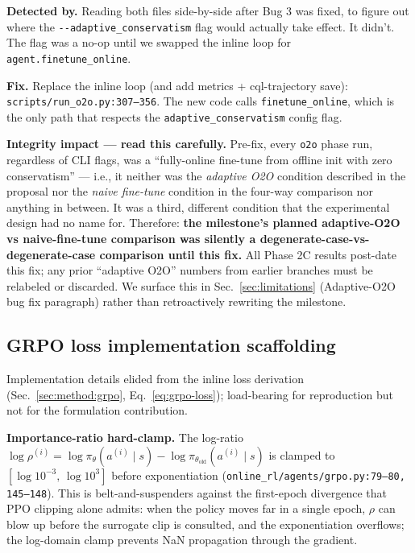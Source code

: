 \textbf{Detected by.} Reading both files side-by-side after Bug 3 was
fixed, to figure out where the \texttt{-{}-adaptive\_conservatism} flag
would actually take effect. It didn't. The flag was a no-op until we
swapped the inline loop for \texttt{agent.finetune\_online}.

\textbf{Fix.} Replace the inline loop (and add metrics + cql-trajectory
save): \texttt{scripts/run\_o2o.py:307--356}. The new code calls
\texttt{finetune\_online}, which is the only path that respects the
\texttt{adaptive\_conservatism} config flag.

\textbf{Integrity impact --- read this carefully.} Pre-fix, every
\texttt{o2o} phase run, regardless of CLI flags, was a ``fully-online
fine-tune from offline init with zero conservatism'' --- i.e., it
neither was the \emph{adaptive O2O} condition described in the proposal
nor the \emph{naive fine-tune} condition in the four-way comparison nor
anything in between. It was a third, different condition that the
experimental design had no name for. Therefore: \textbf{the milestone's
planned adaptive-O2O vs naive-fine-tune comparison was silently a
degenerate-case-vs-degenerate-case comparison until this fix.} All
Phase 2C results post-date this fix; any prior ``adaptive O2O'' numbers
from earlier branches must be relabeled or discarded. We surface this
in Sec.~\ref{sec:limitations} (Adaptive-O2O bug fix paragraph) rather
than retroactively rewriting the milestone.

\subsection{GRPO loss implementation scaffolding}
\label{app:impl:grpo-loss}

Implementation details elided from the inline loss derivation
(Sec.~\ref{sec:method:grpo}, Eq.~\ref{eq:grpo-loss}); load-bearing for
reproduction but not for the formulation contribution.

\textbf{Importance-ratio hard-clamp.} The log-ratio
$\log \rho^{(i)} = \log \pi_\theta(a^{(i)} \mid s) - \log
\pi_{\theta_{\text{old}}}(a^{(i)} \mid s)$ is clamped to $[\log
10^{-3},\,\log 10^{3}]$ before exponentiation
(\texttt{online\_rl/agents/grpo.py:79--80, 145--148}). This is
belt-and-suspenders against the first-epoch divergence that PPO
clipping alone admits: when the policy moves far in a single epoch,
$\rho$ can blow up before the surrogate clip is consulted, and the
exponentiation overflows; the log-domain clamp prevents NaN
propagation through the gradient.

